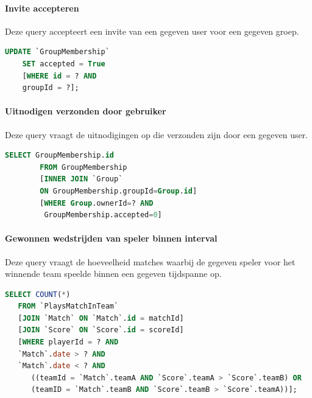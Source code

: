 \documentclass[11pt]{article}
\begin{document}
\paragraph{Invite accepteren}

  Deze query accepteert een invite van een gegeven user voor een gegeven groep.

  \begin{framed}
  \begin{lstlisting}[language=sql]
    UPDATE `GroupMembership`
    SET accepted = True
    [WHERE id = ? AND 
    groupId = ?];
  \end{lstlisting}
  \end{framed}  

\paragraph{Uitnodigen verzonden door gebruiker}

  Deze query vraagt de uitnodigingen op die verzonden zijn door een gegeven user.

  \begin{framed}
  \begin{lstlisting}[language=sql]
    SELECT GroupMembership.id
		FROM GroupMembership
		[INNER JOIN `Group`
		ON GroupMembership.groupId=Group.id]
		[WHERE Group.ownerId=? AND
		 GroupMembership.accepted=0]
  \end{lstlisting}
  \end{framed}


\paragraph{Gewonnen wedstrijden van speler binnen interval}

  Deze query vraagt de hoeveelheid matches waarbij de gegeven speler voor het winnende team speelde binnen een gegeven tijdspanne op.

  \begin{framed}
  \begin{lstlisting}[language=sql]
  SELECT COUNT(*)
   FROM `PlaysMatchInTeam`
   [JOIN `Match` ON `Match`.id = matchId]
   [JOIN `Score` ON `Score`.id = scoreId]
   [WHERE playerId = ? AND
   `Match`.date > ? AND
   `Match`.date < ? AND
      ((teamId = `Match`.teamA AND `Score`.teamA > `Score`.teamB) OR
      (teamID = `Match`.teamB AND `Score`.teamB > `Score`.teamA))];
  \end{lstlisting}
  \end{framed}
\end{document}
